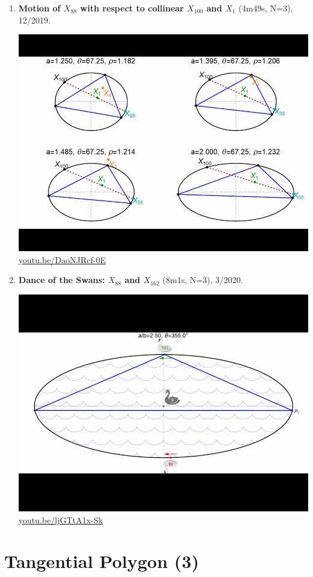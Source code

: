 \documentclass[12pt]{amsart}
\begin{document}
\begin{enumerate}[resume]
\item \textbf{Motion of $X_{88}$ with respect to collinear $X_{100}$ and $X_{1}$} (4m49s, N=3), 12/2019. 
\begin{center}\includegraphics[width=.5\textwidth]{pics/DaoNJRcf-0E.jpg} \\ 
\href{https://youtu.be/DaoNJRcf-0E}{\url{youtu.be/DaoNJRcf-0E}}\end{center}
% 
\item \textbf{Dance of the Swans: $X_{88}$ and $X_{162}$} (8m1s, N=3), 3/2020. 
\begin{center}\includegraphics[width=.5\textwidth]{pics/ljGTtA1x-Sk.jpg} \\ 
\href{https://youtu.be/ljGTtA1x-Sk}{\url{youtu.be/ljGTtA1x-Sk}}\end{center}
% 
\end{enumerate}

\section{Tangential Polygon (3)}
\end{document}
